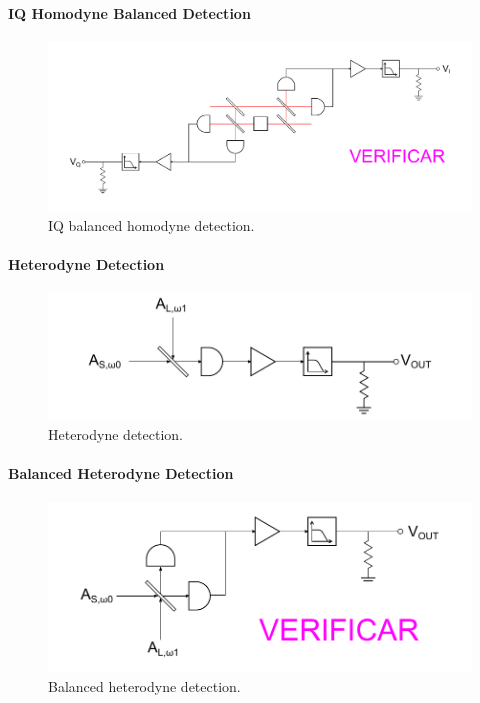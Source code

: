 \begin{bibunit}[plain]
\paragraph{IQ Homodyne Balanced Detection}
\begin{figure}[H]
	\centering
	\includegraphics[width=15cm]{./sdf/optical_detection/figures/detection-IQ-balanced-homodyne.pdf}
	\caption{IQ balanced homodyne detection.}
\end{figure}




\paragraph{Heterodyne Detection}
\begin{figure}[H]
	\centering
	\includegraphics{./sdf/optical_detection/figures/detection-heterodyne.pdf}
	\caption{Heterodyne detection.}
\end{figure}




\paragraph{Balanced Heterodyne Detection}
\begin{figure}[H]
	\centering
	\includegraphics{./sdf/optical_detection/figures/detection-balanced-heterodyne.pdf}
	\caption{Balanced heterodyne detection.}
\end{figure}





\end{bibunit}
